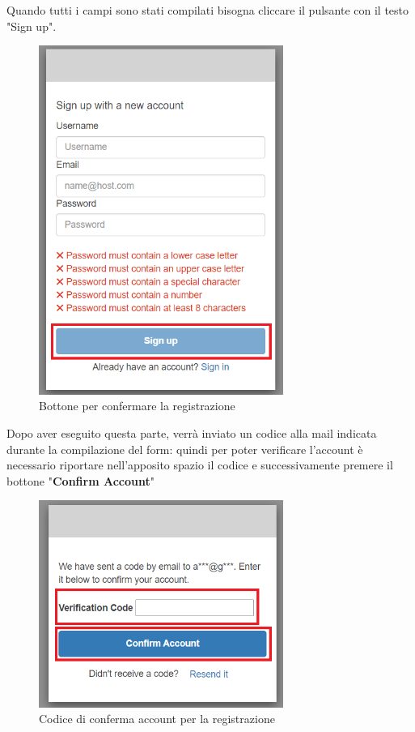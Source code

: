 {Quando tutti i campi sono stati compilati bisogna cliccare il pulsante con il testo "Sign up". 
\begin{figure}[H]
    \includegraphics[width=8cm]{sezioni/images/tasto-conf-reg.png}
    \centering
    \caption{Bottone per confermare la registrazione}
\end{figure} 
Dopo aver eseguito questa parte, verrà inviato un codice alla mail indicata durante la compilazione del form: quindi per poter verificare
l'account è necessario riportare nell'apposito spazio il codice e successivamente premere il bottone "\textbf{Confirm Account}" 
\begin{figure}[H]
    \includegraphics[width=8cm]{sezioni/images/codice-reg.png}
    \centering
    \caption{Codice di conferma account per la registrazione}
\end{figure}

}
